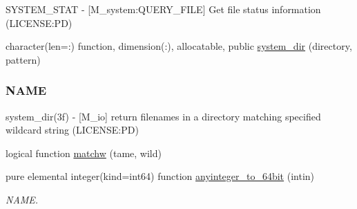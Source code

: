\begin{DoxyCompactItemize}
\begin{DoxyCompactList}
S\+Y\+S\+T\+E\+M\+\_\+\+S\+T\+AT -\/ \mbox{[}M\+\_\+system\+:Q\+U\+E\+R\+Y\+\_\+\+F\+I\+LE\mbox{]} Get file status information (L\+I\+C\+E\+N\+SE\+:PD) \end{DoxyCompactList}\item 
character(len=\+:) function, dimension(\+:), allocatable, public \mbox{\hyperlink{namespacem__system_a744f46033ef5e7ae95ec6cbff3ae3f89}{system\+\_\+dir}} (directory, pattern)
\begin{DoxyCompactList}\small\item\em \subsubsection*{N\+A\+ME}

system\+\_\+dir(3f) -\/ \mbox{[}M\+\_\+io\mbox{]} return filenames in a directory matching specified wildcard string (L\+I\+C\+E\+N\+SE\+:PD) \end{DoxyCompactList}\item 
logical function \mbox{\hyperlink{namespacem__system_a0fccb69d0a56044b05e85b8df9f90aea}{matchw}} (tame, wild)
\item 
pure elemental integer(kind=int64) function \mbox{\hyperlink{namespacem__system_a151da54be39dddcf270cceeff3243438}{anyinteger\+\_\+to\+\_\+64bit}} (intin)
\begin{DoxyCompactList}\small\item\em N\+A\+ME. \end{DoxyCompactList}\end{DoxyCompactItemize}
